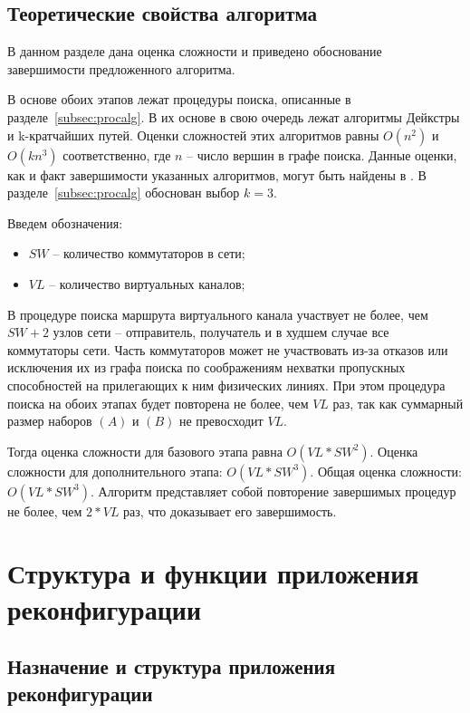 \documentclass[12pt, a4paper]{article}
\begin{document}
\subsection{Теоретические свойства алгоритма}

В данном разделе дана оценка сложности и приведено обоснование завершимости предложенного алгоритма.

В основе обоих этапов лежат процедуры поиска, описанные в разделе~\ref{subsec:procalg}. В их основе в свою очередь лежат алгоритмы Дейкстры и k-кратчайших путей. Оценки сложностей этих алгоритмов равны $O(n^2)$ и $O(kn^3)$ соответственно, где $n$ -- число вершин в графе поиска. Данные оценки, как и факт завершимости указанных алгоритмов, могут быть найдены в \cite{dejkstra, kshort}. В разделе~\ref{subsec:procalg} обоснован выбор $k=3$. 

Введем обозначения:
\begin{itemize}
	\item $SW$ -- количество коммутаторов в сети;
	\item $VL$ -- количество виртуальных каналов;
\end{itemize}

В процедуре поиска маршрута виртуального канала участвует не более, чем $SW + 2$ узлов сети -- отправитель, получатель и в худшем случае все коммутаторы сети. Часть коммутаторов может не участвовать из-за отказов или исключения их из графа поиска по соображениям нехватки пропускных способностей на прилегающих к ним физических линиях. При этом процедура поиска на обоих этапах будет повторена не более, чем $VL$ раз, так как суммарный размер наборов $(A)$ и $(B)$ не превосходит $VL$.

Тогда оценка сложности для базового этапа равна $O(VL \ast SW^2)$. Оценка сложности для дополнительного этапа: $O(VL \ast SW^3)$. Общая оценка сложности: $O(VL \ast SW^3)$. Алгоритм представляет собой повторение завершимых процедур не более, чем $2 \ast VL$ раз, что доказывает его завершимость.




\section{Структура и функции приложения реконфигурации}
\subsection{Назначение и структура приложения реконфигурации}
\end{document}
